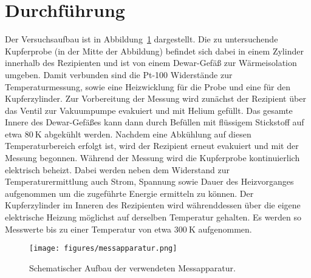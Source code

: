 \section{Durchführung}
\label{sec:durchführung}
%
Der Versuchsaufbau ist in Abbildung~\ref{fig:aufbau} dargestellt. Die zu untersuchende Kupferprobe (in der Mitte der Abbildung) befindet sich dabei in einem Zylinder innerhalb des Rezipienten und ist von einem Dewar-Gefäß zur Wärmeisolation umgeben. Damit verbunden sind die Pt-100 Widerstände zur Temperaturmessung, sowie eine Heizwicklung für die Probe und eine für den Kupferzylinder.
Zur Vorbereitung der Messung wird zunächst der Rezipient über das Ventil zur Vakuumpumpe evakuiert und mit Helium gefüllt. Das gesamte Innere des Dewar-Gefäßes kann dann durch Befüllen mit flüssigem Stickstoff auf etwa $\SI{80}{\kelvin}$ abgekühlt werden. Nachdem eine Abkühlung auf diesen Temperaturbereich erfolgt ist, wird der Rezipient erneut evakuiert und mit der Messung begonnen.
Während der Messung wird die Kupferprobe kontinuierlich elektrisch beheizt. Dabei werden neben dem Widerstand zur Temperaturermittlung auch Strom, Spannung sowie Dauer des Heizvorganges aufgenommen um die zugeführte Energie ermitteln zu können. Der Kupferzylinder im Inneren des Rezipienten wird währenddessen über die eigene elektrische Heizung möglichst auf derselben Temperatur gehalten. Es werden so Messwerte bis zu einer Temperatur von etwa $\SI{300}{\kelvin}$ aufgenommen.

\begin{figure}
    \centering
    \texttt{[image: figures/messapparatur.png]}
    \caption{Schematischer Aufbau der verwendeten Messapparatur.\cite{V47}}
    \label{fig:aufbau}
\end{figure}
